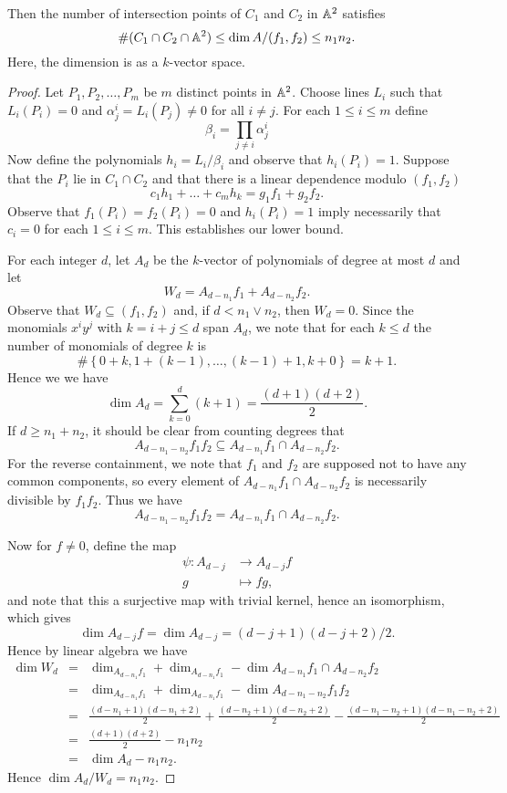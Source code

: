 \documentclass[10pt]{amsart}
\begin{document}
\begin{prop}\label{prop1}
	Then the number of intersection points of $C_1$ and $C_2$ in $\mathbb{A}^2$ satisfies
		$$\#(C_1 \cap C_2 \cap \mathbb{A}^2) \leq \dim A /(f_1,f_2) \leq n_1n_2.$$
	Here, the dimension is as a $k$-vector space.

	\begin{proof}
		Let $P_1, P_2, \ldots, P_m$ be $m$ distinct points in $\mathbb{A}^2$.
		Choose lines $L_i$ such that $L_i(P_i) = 0$ and $\alpha_j^i = L_i(P_j) \neq 0$ for all $i \neq j$.
		For each $1 \leq i \leq m$ define $$\beta_i = \prod_{j \neq i} \alpha_j^i$$
		Now define the polynomials $h_i = L_i/\beta_i$ and observe that $h_i(P_i) = 1$.
		Suppose that the $P_i$ lie in $C_1 \cap C_2$ and that there is a linear dependence modulo $(f_1, f_2)$
			$$c_1h_1 + \ldots + c_mh_k = g_1f_1 + g_2f_2.$$
		Observe that $f_1(P_i) = f_2(P_i) = 0$ and $h_i(P_i) = 1$ imply necessarily that $c_i = 0$ for each $1 \leq i \leq m$.
		This establishes our lower bound.

		For each integer $d$, let $A_d$ be the $k$-vector of polynomials of degree at most $d$ and let 
			$$W_d = A_{d - n_1}f_1 + A_{d - n_2}f_2.$$
		Observe that $W_d \subseteq (f_1, f_2)$ and, if $d < n_1 \vee n_2$, then $W_d = 0$.
		Since the monomials $x^iy^j$ with $k = i + j \leq d$ span $A_d$, we note that for each $k \leq d$ the number of monomials of degree $k$ is
			$$\#\left\{0 + k, 1 + (k-1), \ldots, (k-1) + 1, k + 0\right\} = k + 1.$$
		Hence we we have
			$$\dim{A_d} = \sum_{k=0}^d (k + 1) = \frac{(d + 1)(d + 2)}{2}.$$
		If $d \geq n_1 + n_2$, it should be clear from counting degrees that 
			$$A_{d - n_1 - n_2}f_1f_2 \subseteq A_{d - n_1}f_1 \cap A_{d - n_2}f_2.$$
		For the reverse containment, we note that $f_1$ and $f_2$ are supposed not to have any common components, so every element of $A_{d - n_1}f_1 \cap A_{d - n_2}f_2$ is necessarily divisible by $f_1f_2$.
		Thus we have 
		\begin{equation}\label{eq1.1}
			A_{d - n_1 - n_2}f_1f_2 = A_{d - n_1}f_1 \cap A_{d - n_2}f_2.
		\end{equation}

		Now for $f \neq 0$, define the map
		\begin{align*}
			\psi \colon A_{d-j} &\rightarrow A_{d-j}f\\
			g &\mapsto fg,
		\end{align*}
		and note that this a surjective map with trivial kernel, hence an isomorphism, which gives 
			$$\dim{A_{d-j}}f = \dim{A_{d-j}} = (d-j + 1)(d - j + 2)/2.$$
		Hence by linear algebra we have
		\begin{eqnarray*}
			\dim{W_d} &=& \dim_{A_{d - n_1}f_1} + \dim_{A_{d - n_1}f_1} - \dim{A_{d - n_1}f_1 \cap A_{d - n_2}f_2}\\
			&=& \dim_{A_{d - n_1}f_1} + \dim_{A_{d - n_1}f_1} - \dim{A_{d - n_1 - n_2}f_1f_2}\\
			&=& \frac{(d - n_1 + 1)(d - n_1 + 2)}{2} + \frac{(d - n_2 + 1)(d - n_2 + 2)}{2} - \frac{(d - n_1 - n_2 + 1)(d - n_1 - n_2 + 2)}{2}\\
			&=& \frac{(d + 1)(d + 2)}{2} - n_1n_2\\
			&=& \dim{A_d} - n_1n_2.
		\end{eqnarray*}
		Hence $\dim{A_d/W_d} = n_1n_2$.


\end{proof}
\end{prop}
\end{document}
